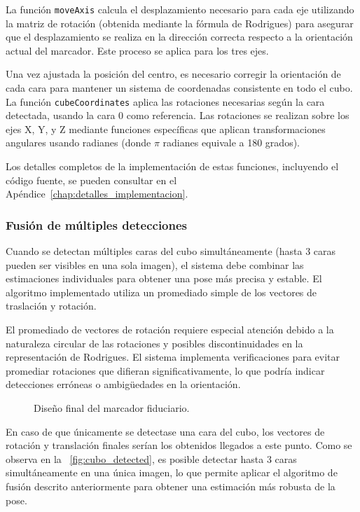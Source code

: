 La función \texttt{moveAxis} calcula el desplazamiento necesario para cada eje utilizando la matriz de rotación (obtenida mediante la fórmula de Rodrigues) para asegurar que el desplazamiento se realiza en la dirección correcta respecto a la orientación actual del marcador. Este proceso se aplica para los tres ejes.

Una vez ajustada la posición del centro, es necesario corregir la orientación de cada cara para mantener un sistema de coordenadas consistente en todo el cubo. La función \texttt{cubeCoordinates} aplica las rotaciones necesarias según la cara detectada, usando la cara 0 como referencia. Las rotaciones se realizan sobre los ejes X, Y, y Z mediante funciones específicas que aplican transformaciones angulares usando radianes (donde $\pi$ radianes equivale a 180 grados).

Los detalles completos de la implementación de estas funciones, incluyendo el código fuente, se pueden consultar en el Apéndice~\ref{chap:detalles_implementacion}.

\subsubsection{Fusión de múltiples detecciones}
Cuando se detectan múltiples caras del cubo simultáneamente (hasta 3 caras pueden ser visibles en una sola imagen), el sistema debe combinar las estimaciones individuales para obtener una pose más precisa y estable. El algoritmo implementado utiliza un promediado simple de los vectores de traslación y rotación.

El promediado de vectores de rotación requiere especial atención debido a la naturaleza circular de las rotaciones y posibles discontinuidades en la representación de Rodrigues. El sistema implementa verificaciones para evitar promediar rotaciones que difieran significativamente, lo que podría indicar detecciones erróneas o ambigüedades en la orientación.


\begin{figure}%
	\centering
	\qquad
	\caption{Diseño final del marcador fiduciario.}%
	\label{fig:cubo_marker}%
\end{figure}

En caso de que únicamente se detectase una cara del cubo, los vectores de rotación y translación finales serían los obtenidos llegados a este punto. Como se observa en la \figurename~\ref{fig:cubo_detected}, es posible detectar hasta 3 caras simultáneamente en una única imagen, lo que permite aplicar el algoritmo de fusión descrito anteriormente para obtener una estimación más robusta de la pose.

